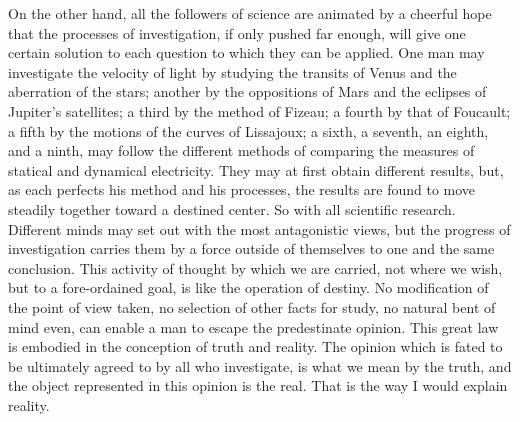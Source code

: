 On the other hand, all the followers of science are animated by a cheerful hope that the processes of investigation, if only pushed far enough, will give one certain solution to each question to which they can be applied. One man may investigate the velocity of light by studying the
transits of Venus and the aberration of the stars; another by the oppositions of Mars and the eclipses of Jupiter's satellites; a third by the method of Fizeau; a fourth by that of Foucault; a fifth by the motions of the curves of
Lissajoux; a sixth, a seventh, an eighth, and a ninth, may follow the different methods of comparing the measures of statical and dynamical electricity. They may at first obtain different results, but, as each perfects his method and his processes, the results are found to move steadily together toward a destined center. So with all scientific research. Different minds may set out with the most antagonistic views, but the progress of investigation carries them by a force outside of themselves to one and the same conclusion. This activity of thought by which we are carried, not where we wish, but to a fore-ordained goal, is like the operation of destiny. No modification of the
point of view taken, no selection of other facts for study, no natural bent of mind even, can enable a man to escape the predestinate opinion. This great law is embodied in the conception of truth and reality. The opinion which is fated to be ultimately agreed to by all who investigate, is what we mean by the truth, and the object represented in this opinion is the real. That is the way I would explain reality.


